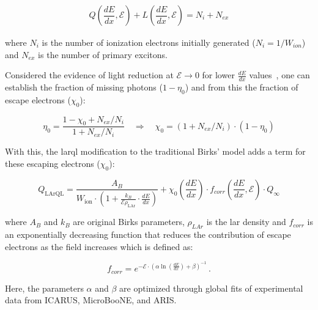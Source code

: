 \begin{align}
    Q\left(\dfrac{dE}{dx}, \mathcal{E}\right) + L\left(\dfrac{dE}{dx}, \mathcal{E}\right) = N_i + N_{ex}
\end{align}

where $N_i$ is the number of ionization electrons initially generated ($N_i = 1/W_{ion}$) and $N_{ex}$ is the number of primary excitons.

Considered the evidence of light reduction at $\mathcal{E} \to 0$ for lower $\frac{dE}{dx}$ values~\cite{Doke_2002}, one can establish the fraction of missing photons ($1-\eta_0$) and from this the fraction of escape electrons ($\chi_0$):

\begin{equation}
    \eta_0 = \frac{1 - \chi_0 + N_{ex}/N_i}{1 + N_{ex}/N_i} \quad \Rightarrow \quad \chi_0 = (1 + N_{ex}/N_i) \cdot (1 - \eta_0)
\end{equation}

With this, the \gls{larql} modification to the traditional Birks' model adds a term for these escaping electrons ($\chi_0$):

\begin{equation}
    Q_\text{LArQL} = \frac{A_B}{W_\text{ion}\cdot\left(1 + \frac{k_B}{\mathcal{E}\rho_\text{LAr}} \cdot \frac{dE}{dx}\right)} + \chi_0\left(\dfrac{dE}{dx}\right) \cdot f_{corr}\left(\dfrac{dE}{dx}, \mathcal{E}\right) \cdot Q_\infty
\end{equation}

where $A_B$ and $k_B$ are original Birks parameters, $\rho_{LAr}$ is the \gls{lar} density and $f_{corr}$ is an exponentially decreasing function that reduces the contribution of escape electrons as the field increases which is defined as:

\begin{equation}
    f_{corr} = e^{-\mathcal{E}\cdot\left(\alpha \ln(\frac{dE}{dx}) + \beta\right)^{-1}}\,.
\end{equation}

Here, the parameters $\alpha$ and $\beta$ are optimized through global fits of experimental data from ICARUS, MicroBooNE, and ARIS.

